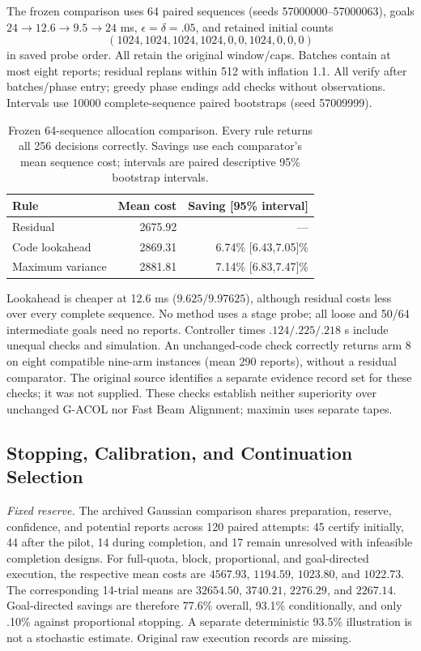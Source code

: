 The frozen comparison uses 64 paired sequences (seeds 57000000--57000063), goals $24\to12.6\to9.5\to24$ ms, $\epsilon=\delta=.05$, and retained initial counts
$$(1024,1024,1024,1024,0,0,1024,0,0,0)$$
in saved probe order. All retain the original window/caps. Batches contain at most eight reports; residual replans within 512 with inflation 1.1. All verify after batches/phase entry; greedy phase endings add checks without observations. Intervals use 10000 complete-sequence paired bootstraps (seed 57009999).

\begin{table}[t]
\centering\small
\caption{Frozen 64-sequence allocation comparison. Every rule returns all 256 decisions correctly. Savings use each comparator's mean sequence cost; intervals are paired descriptive 95\% bootstrap intervals.}
\label{tab:allocation-replication-cost}
\label{tab:allocation-replication-savings}
\setlength{\tabcolsep}{3pt}
\begin{tabular}{@{}lrr@{}}
\toprule
Rule & Mean cost & Saving [95\% interval]\\
\midrule
Residual &2675.92&---\\
Code lookahead &2869.31&6.74\% [6.43,7.05]\%\\
Maximum variance &2881.81&7.14\% [6.83,7.47]\%\\
\bottomrule
\end{tabular}
\end{table}
Lookahead is cheaper at 12.6 ms ($9.625/9.97625$), although residual costs less over every complete sequence. No method uses a stage probe; all loose and 50/64 intermediate goals need no reports. Controller times $.124/.225/.218$ s include unequal checks and simulation. An unchanged-code check correctly returns arm 8 on eight compatible nine-arm instances (mean 290 reports), without a residual comparator. The original source identifies a separate evidence record set for these checks; it was not supplied. These checks establish neither superiority over unchanged G-ACOL nor Fast Beam Alignment; maximin uses separate tapes.

\subsection{Stopping, Calibration, and Continuation Selection}
\label{app:execution-saving}
\emph{Fixed reserve.} The archived Gaussian comparison shares preparation, reserve, confidence, and potential reports across 120 paired attempts: 45 certify initially, 44 after the pilot, 14 during completion, and 17 remain unresolved with infeasible completion designs. For full-quota, block, proportional, and goal-directed execution, the respective mean costs are $4567.93$, $1194.59$, $1023.80$, and $1022.73$. The corresponding 14-trial means are $32654.50$, $3740.21$, $2276.29$, and $2267.14$. Goal-directed savings are therefore 77.6\% overall, 93.1\% conditionally, and only .10\% against proportional stopping. A separate deterministic 93.5\% illustration is not a stochastic estimate. Original raw execution records are missing.

